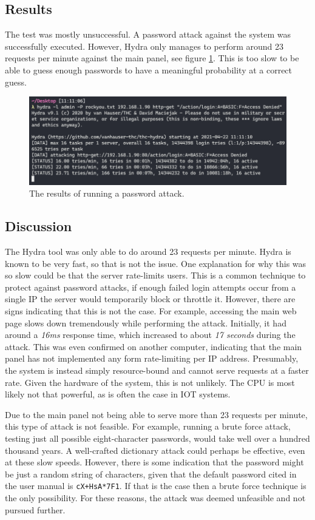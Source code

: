 \subsection{Results}
The test was mostly unsuccessful. A password attack against the system was successfully executed. However, Hydra only manages to perform around 23 requests per minute against the main panel, see figure \ref{fig:hydra-password-attack}. This is too slow to be able to guess enough passwords to have a meaningful probability at a correct guess.
\begin{figure}[!ht]
    \centering
    \includegraphics[width=\textwidth]{images/6-pentesting/hydra-results.png}
    \caption{The results of running a password attack.}
    \label{fig:hydra-password-attack}
\end{figure}

\subsection{Discussion}
The Hydra tool was only able to do around 23 requests per minute. Hydra is known to be very fast, so that is not the issue. One explanation for why this was so slow could be that the server rate-limits users. This is a common technique to protect against password attacks, if enough failed login attempts occur from a single IP the server would temporarily block or throttle it. However, there are signs indicating that this is not the case. For example, accessing the main web page slows down tremendously while performing the attack. Initially, it had around a \textit{16ms} response time, which increased to about \textit{17 seconds} during the attack. This was even confirmed on another computer, indicating that the main panel has not implemented any form rate-limiting per IP address. Presumably, the system is instead simply resource-bound and cannot serve requests at a faster rate. Given the hardware of the system, this is not unlikely. The CPU is most likely not that powerful, as is often the case in \gls{IOT} systems.

Due to the main panel not being able to serve more than 23 requests per minute, this type of attack is not feasible. For example, running a brute force attack, testing just all possible eight-character passwords, would take well over a hundred thousand years. A well-crafted dictionary attack could perhaps be effective, even at these slow speeds. However, there is some indication that the password might be just a random string of characters, given that the default password cited in the user manual is \texttt{cX+HsA*7F1}. If that is the case then a brute force technique is the only possibility. For these reasons, the attack was deemed unfeasible and not pursued further.
